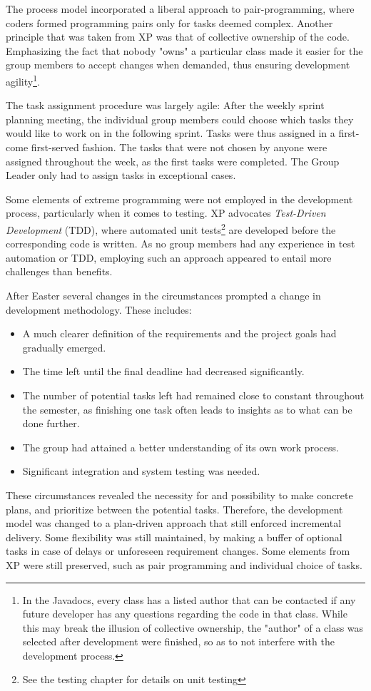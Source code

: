 The process model incorporated a liberal approach to pair-programming, where coders formed programming pairs only for tasks deemed complex. Another principle that was taken from XP was that of collective ownership of the code. Emphasizing the fact that nobody "owns" a particular class made it easier for the group members to accept changes when demanded, thus ensuring development agility\footnote{In the Javadocs, every class has a listed author that can be contacted if any future developer has any questions regarding the code in that class. While this may break the illusion of collective ownership, the "author" of a class was selected after development were finished, so as to not interfere with the development process.}.

The task assignment procedure was largely agile: After the weekly sprint planning meeting, the individual group members could choose which tasks they would like to work on in the following sprint. Tasks were thus assigned in a first-come first-served fashion. The tasks that were not chosen by anyone were assigned throughout the week, as the first tasks were completed. The Group Leader only had to assign tasks in exceptional cases.

Some elements of extreme programming were not employed in the development process, particularly when it comes to testing. XP advocates \emph{Test-Driven Development} (TDD), where automated unit tests\footnote{See the testing chapter for details on unit testing} are developed before the corresponding code is written. As no group members had any experience in test automation or TDD, employing such an approach appeared to entail more challenges than benefits. 

After Easter several changes in the circumstances prompted a change in development methodology. These includes:
\begin{itemize}
\item A much clearer definition of the requirements and the project goals had gradually emerged.
\item The time left until the final deadline had decreased significantly.
\item The number of potential tasks left had remained close to constant throughout the semester, as finishing one task often leads to insights as to what can be done further.
\item The group had attained a better understanding of its own work process. 
\item Significant integration and system testing was needed.
\end{itemize}
These circumstances revealed the necessity for and possibility to make concrete plans, and prioritize between the potential tasks. Therefore,  the development model was changed to a plan-driven approach that still enforced incremental delivery. Some flexibility was still maintained, by making a buffer of optional tasks in case of delays or unforeseen requirement changes. Some elements from XP were still preserved, such as pair programming and individual choice of tasks.


